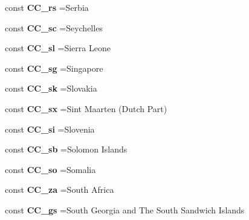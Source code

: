 \begin{DoxyCompactItemize}
\item 
\hypertarget{class_i_s_o_aa86d892468dd10dc205bf0d5d41c7bb5}{}\label{class_i_s_o_aa86d892468dd10dc205bf0d5d41c7bb5} 
const {\bfseries C\+C\+\_\+rs} =\textquotesingle{}Serbia\textquotesingle{}
\item 
\hypertarget{class_i_s_o_aa5911180644d7b8354cf743c393d1b3e}{}\label{class_i_s_o_aa5911180644d7b8354cf743c393d1b3e} 
const {\bfseries C\+C\+\_\+sc} =\textquotesingle{}Seychelles\textquotesingle{}
\item 
\hypertarget{class_i_s_o_a1d496b65d775f11cf117d650bb86dc6e}{}\label{class_i_s_o_a1d496b65d775f11cf117d650bb86dc6e} 
const {\bfseries C\+C\+\_\+sl} =\textquotesingle{}Sierra Leone\textquotesingle{}
\item 
\hypertarget{class_i_s_o_aee3ea3c49265a31c2d8bb4187e5de8d6}{}\label{class_i_s_o_aee3ea3c49265a31c2d8bb4187e5de8d6} 
const {\bfseries C\+C\+\_\+sg} =\textquotesingle{}Singapore\textquotesingle{}
\item 
\hypertarget{class_i_s_o_a92c287ce513fbf7134a595795fbc457e}{}\label{class_i_s_o_a92c287ce513fbf7134a595795fbc457e} 
const {\bfseries C\+C\+\_\+sk} =\textquotesingle{}Slovakia\textquotesingle{}
\item 
\hypertarget{class_i_s_o_a96859a07cddf133ed1acb4ade865b7e3}{}\label{class_i_s_o_a96859a07cddf133ed1acb4ade865b7e3} 
const {\bfseries C\+C\+\_\+sx} =\textquotesingle{}Sint Maarten (Dutch Part)\textquotesingle{}
\item 
\hypertarget{class_i_s_o_aee43f5ee3e5fc727f53b4ee047adb2ff}{}\label{class_i_s_o_aee43f5ee3e5fc727f53b4ee047adb2ff} 
const {\bfseries C\+C\+\_\+si} =\textquotesingle{}Slovenia\textquotesingle{}
\item 
\hypertarget{class_i_s_o_a1d00792ace74b10d3579a246069f43ea}{}\label{class_i_s_o_a1d00792ace74b10d3579a246069f43ea} 
const {\bfseries C\+C\+\_\+sb} =\textquotesingle{}Solomon Islands\textquotesingle{}
\item 
\hypertarget{class_i_s_o_a6c77d1bfd7316beda26e72b677a61ac6}{}\label{class_i_s_o_a6c77d1bfd7316beda26e72b677a61ac6} 
const {\bfseries C\+C\+\_\+so} =\textquotesingle{}Somalia\textquotesingle{}
\item 
\hypertarget{class_i_s_o_a5a97f094307107950417b1c6ac117756}{}\label{class_i_s_o_a5a97f094307107950417b1c6ac117756} 
const {\bfseries C\+C\+\_\+za} =\textquotesingle{}South Africa\textquotesingle{}
\item 
\hypertarget{class_i_s_o_a08e4a5115e733891cecf3f9dba9e1b7c}{}\label{class_i_s_o_a08e4a5115e733891cecf3f9dba9e1b7c} 
const {\bfseries C\+C\+\_\+gs} =\textquotesingle{}South Georgia and The South Sandwich Islands\textquotesingle{}

\end{DoxyCompactItemize}
